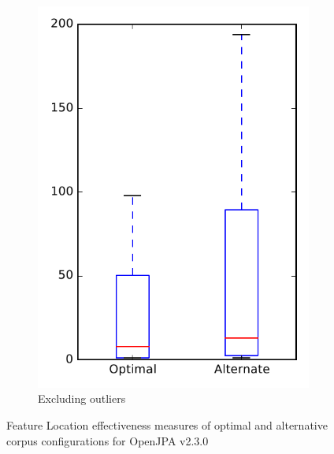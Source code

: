 \begin{figure}
\begin{subfigure}{.4\textwidth}
        \includegraphics[height=0.4\textheight]{figures/combo/flt_rq2_openjpa_no_outlier}
        \caption{Excluding outliers}\label{fig:combo:flt:rq2:openjpa_no_outlier}
    \end{subfigure}
\caption{Feature Location effectiveness measures of optimal and alternative corpus configurations for OpenJPA v2.3.0}
\label{fig:combo:flt:rq2:openjpa}
\end{figure}
